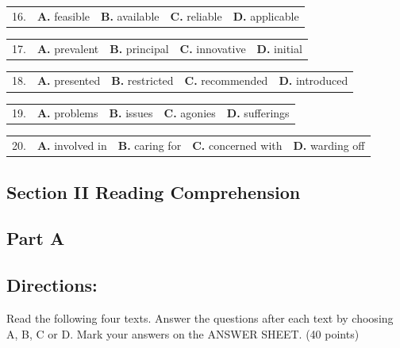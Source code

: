\documentclass[UTF8,11pt]{ctexart}
\begin{document}
\noindent\begin{tabularx}{\linewidth}{@{}lXXXX@{}}16. & \textbf{A.} feasible & \textbf{B.} available & \textbf{C.} reliable & \textbf{D.} applicable\\\end{tabularx}\par

\noindent\begin{tabularx}{\linewidth}{@{}lXXXX@{}}17. & \textbf{A.} prevalent & \textbf{B.} principal & \textbf{C.} innovative & \textbf{D.} initial\\\end{tabularx}\par

\noindent\begin{tabularx}{\linewidth}{@{}lXXXX@{}}18. & \textbf{A.} presented & \textbf{B.} restricted & \textbf{C.} recommended & \textbf{D.} introduced\\\end{tabularx}\par

\noindent\begin{tabularx}{\linewidth}{@{}lXXXX@{}}19. & \textbf{A.} problems & \textbf{B.} issues & \textbf{C.} agonies & \textbf{D.} sufferings\\\end{tabularx}\par

\noindent\begin{tabularx}{\linewidth}{@{}lXXXX@{}}20. & \textbf{A.} involved in & \textbf{B.} caring for & \textbf{C.} concerned with & \textbf{D.} warding off\\\end{tabularx}\par

\subsection*{\textbf{Section II} \textbf{Reading Comprehension}}


\subsection*{\textbf{Part A}}


\subsection*{\textbf{Directions:}}


Read the following four texts. Answer the questions after each text by choosing A, B, C or D. Mark your answers on the ANSWER SHEET. (40 points)
\end{document}
